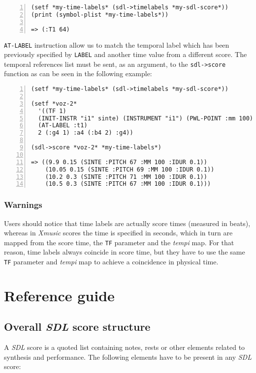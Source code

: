 \begin{Verbatim}[frame=single,fontsize=\small,numbers=left,numbersep=2mm,
                 commandchars=+\[\]]
(setf *my-time-labels* (sdl->timelabels *my-sdl-score*))
(print (symbol-plist *my-time-labels*))

=> (:T1 64) 
\end{Verbatim}

\texttt{AT-LABEL} instruction allow us to match the temporal label which has been
previously specified by \texttt{LABEL} and another time value from a
different score. The temporal references list must be sent, as an
argument, to the \texttt{sdl->score} function as can be seen in the following example:

\begin{Verbatim}[frame=single,fontsize=\small,numbers=left,numbersep=2mm]
(setf *my-time-labels* (sdl->timelabels *my-sdl-score*))

(setf *voz-2* 
  '((TF 1) 
  (INIT-INSTR "i1" sinte) (INSTRUMENT "i1") (PWL-POINT :mm 100) (ATTR :idur 0.1)
  (AT-LABEL :t1)
  2 (:g4 1) :a4 (:b4 2) :g4))

(sdl->score *voz-2* *my-time-labels*)

=> ((9.9 0.15 (SINTE :PITCH 67 :MM 100 :IDUR 0.1))
    (10.05 0.15 (SINTE :PITCH 69 :MM 100 :IDUR 0.1))
    (10.2 0.3 (SINTE :PITCH 71 :MM 100 :IDUR 0.1))
    (10.5 0.3 (SINTE :PITCH 67 :MM 100 :IDUR 0.1)))
\end{Verbatim}

\subsubsection*{Warnings}

Users should notice that time labels are actually score times (measured in beats), whereas in \textit{Xmusic} scores the time is specified in seconds, which in turn are mapped from the score time, the \texttt{TF} parameter and the \textit{tempi} map. For that reason, time labels always coincide in score time, but they have to use the same \texttt{TF} parameter and \textit{tempi} map to achieve a coincidence in physical time.

\section{Reference guide}
\subsection{Overall \textit{SDL} score structure}
A \textit{SDL} score is a quoted list containing notes, rests or other elements related to synthesis and performance.
The following elements have to be present in any \textit{SDL} score:

